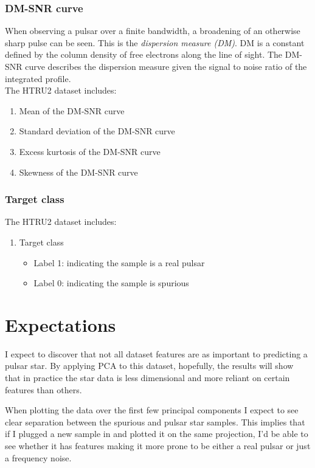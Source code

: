 \documentclass[a4paper,12pt]{article}
\begin{document}
    \subsubsection{DM-SNR curve}
    When observing a pulsar over a finite bandwidth, a broadening of an otherwise sharp pulse can be seen. This is the \textit{dispersion measure (DM)}. DM is a constant defined by the column density of free electrons along the line of sight. The DM-SNR curve describes the dispersion measure given the signal to noise ratio of the integrated profile.\cite{dmstr} \\
    The HTRU2 dataset includes:
    \begin{enumerate}[resume]
        \item Mean of the DM-SNR curve
        \item Standard deviation of the DM-SNR curve
        \item Excess kurtosis of the DM-SNR curve
        \item Skewness of the DM-SNR curve
    \end{enumerate}

    \subsubsection{Target class}
    The HTRU2 dataset includes:
    \begin{enumerate}[resume]
        \item Target class
        \begin{itemize}
            \item Label 1: indicating the sample is a real pulsar
            \item Label 0: indicating the sample is spurious
        \end{itemize}
    \end{enumerate}
    \newpage

    \section{Expectations}
    I expect to discover that not all dataset features are as important to predicting a pulsar star. By applying PCA to this dataset, hopefully, the results will show that in practice the star data is less dimensional and more reliant on certain features than others.\par
    When plotting the data over the first few principal components I expect to see clear separation between the spurious and pulsar star samples. This implies that if I plugged a new sample in and plotted it on the same projection, I’d be able to see whether it has features making it more prone to be either a real pulsar or just a frequency noise.\par
\end{document}
